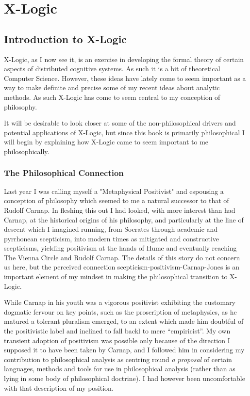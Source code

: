 
\newtheorem{iprin}{I}

\part{X-Logic}\label{partIII}

\chapter{Introduction to X-Logic}

X-Logic, as I now see it, is an exercise in developing the formal theory of certain aspects of distributed cognitive systems.
As such it is a bit of theoretical Computer Science.
However, these ideas have lately come to seem important as a way to make definite and precise some of my recent ideas about analytic methods.
As such X-Logic has come to seem central to my conception of philosophy.

It will be desirable to look closer at some of the non-philosophical drivers and potential applications of X-Logic, but since this book is primarily philosophical I will begin by explaining how X-Logic came to seem important to me philosophically.

\section{The Philosophical Connection}

Last year I was calling myself a "Metaphysical Positivist" and espousing a conception of philosophy which seemed to me a natural successor to that of Rudolf Carnap.
In fleshing this out I had looked, with more interest than had Carnap, at the historical origins of his philosophy, and particularly at the line of descent which I imagined running, from Socrates through academic and pyrrhonean scepticism, into modern times as mitigated and constructive scepticisms, yielding positivism at the hands of Hume and eventually reaching The Vienna Circle and Rudolf Carnap.
The details of this story do not concern us here, but the perceived connection scepticism-positivism-Carnap-Jones is an important element of my mindset in making the philosophical transition to X-Logic.

While Carnap in his youth was a vigorous positivist exhibiting the customary dogmatic fervour on key points, such as the proscription of metaphysics, as he matured a tolerant pluralism emerged, to an extent which made him doubtful of the positivistic label and inclined to fall backl to mere ``empiricist''.
My own transient adoption of positivism was possible only because of the direction I supposed it to have been taken by Carnap, and I followed him in considering my contribution to philosophical analysis as centring round {\it a proposal} of certain languages, methods and tools for use in philosophical analysis (rather than as lying in some body of philosophical doctrine).
I had however been uncomfortable with that description of my position.

